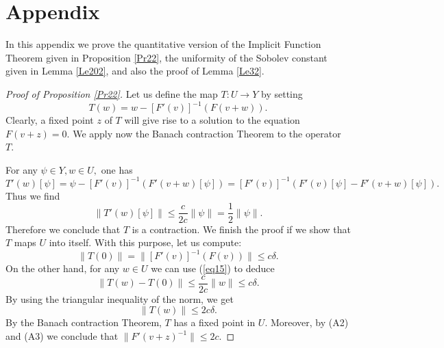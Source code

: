 \documentclass[reqno]{amsart}
\numberwithin{equation}{section}
\newenvironment{key words}{\textbf{Keywords}\mbox{  }}{ }
\begin{document}
\section{Appendix}


In this appendix we prove the quantitative version of the Implicit Function Theorem given in Proposition \ref{Pr22}, the uniformity of the Sobolev constant given in Lemma \ref{Le202}, and also the proof of Lemma \ref{Le32}.


\begin{proof}[Proof of Proposition \ref{Pr22}]
	Let us define the map $T:U\rightarrow Y$ by setting
	\[T(w)=w-[F'(v)]^{-1}(F(v+w)).\]
	Clearly, a fixed point $z$ of $T$ will give rise to a solution to the equation $F(v+z)=0.$ We apply now the Banach contraction Theorem to the operator $T.$
	
	For any $\psi\in Y,w\in U,$ one has
	\[T'(w)[\psi]=\psi-[F'(v)]^{-1}(F'(v+w)[\psi])=[F'(v)]^{-1}(F'(v)[\psi]-F'(v+w)[\psi]).\]
	Thus we find
	\begin{equation}\label{eq15}
		\|T'(w)[\psi]\|\leq\frac{c}{2c }\|\psi\| = \frac{1}{2}\|\psi\|.
	\end{equation}
	Therefore we conclude that $T$ is a contraction. We finish the proof if we show that $T$ maps $U$ into itself. With this purpose, let us compute:
	\[\|T(0)\|=\|[F'(v)]^{-1}(F(v))\|\leq c\delta.\]
	On the other hand, for any $w\in U$ we can use (\ref{eq15}) to deduce
	\[\|T(w)-T(0)\|\leq\frac{c}{2c}\|w\|\leq c\delta.\]
	By using the triangular inequality of the norm, we get
	\[\|T(w)\|\leq2c\delta.\]
	By the Banach contraction Theorem, $T$ has a fixed point in $U$. Moreover, by (A2) and (A3) we conclude that $\| F'(v+z)^{-1} \| \leq 2c$.
\end{proof}

\bigskip
\end{document}

